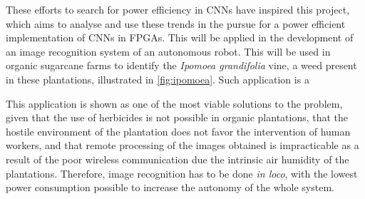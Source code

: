 \documentclass[
    12pt,                       %
    oneside,                    %
    a4paper,                    %
    brazil,                     %
    french,                     %
    spanish,                    %
    english,                    %
    ]{abntex2}
\begin{document}

These efforts to search for power efficiency in CNNs have inspired this project, which aims to analyse and use these trends in the pursue for a power efficient implementation of CNNs in FPGAs. This will be applied in the development of an image recognition system of an autonomous robot. This will be used in organic sugarcane farms to identify the \textit{Ipomoea grandifolia} vine, a weed present in these plantations, illustrated in \autoref{fig:ipomoea}. Such application is a



This application is shown as one of the most viable solutions to the problem, given that the use of herbicides is not possible in organic plantations, that the hostile environment of the plantation does not favor the intervention of human workers, and that remote processing of the images obtained is impracticable as a result of the poor wireless communication due the intrinsic air humidity of the plantations. Therefore, image recognition has to be done \textit{in loco}, with the lowest power consumption possible to increase the autonomy of the whole system.
\end{document}

